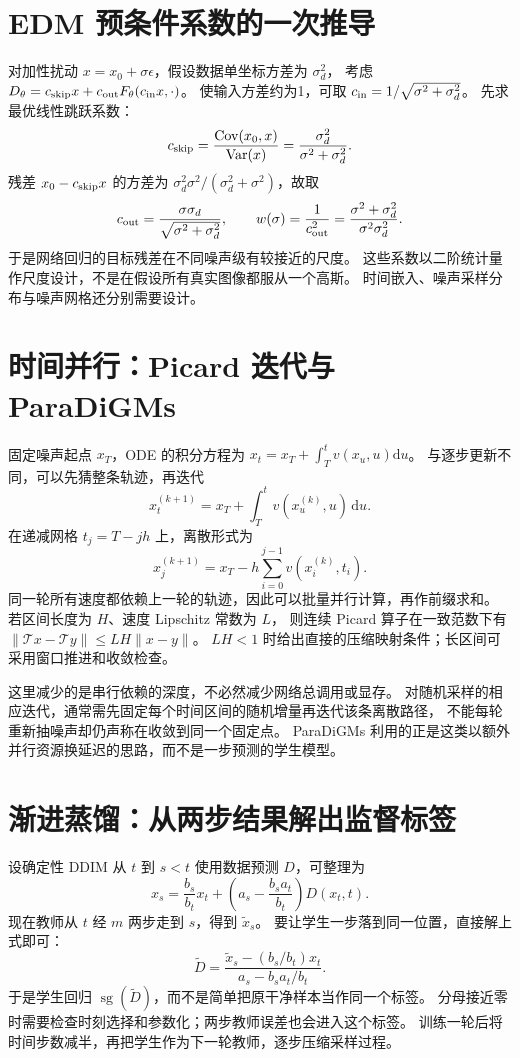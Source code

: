 \section{EDM 预条件系数的一次推导}
对加性扰动 $x=x_0+\sigma\epsilon$，假设数据单坐标方差为 $\sigma_d^2$，
考虑 $D_\theta=c_{\rm skip}x+c_{\rm out}F_\theta(c_{\rm in}x,\cdot)$。
使输入方差约为1，可取
$c_{\rm in}=1/\sqrt{\sigma^2+\sigma_d^2}$。
先求最优线性跳跃系数：
\[
c_{\rm skip}=\frac{\operatorname{Cov}(x_0,x)}{\operatorname{Var}(x)}
=\frac{\sigma_d^2}{\sigma^2+\sigma_d^2}.
\]
残差 $x_0-c_{\rm skip}x$ 的方差为
$\sigma_d^2\sigma^2/(\sigma_d^2+\sigma^2)$，故取
\[
c_{\rm out}=\frac{\sigma\sigma_d}{\sqrt{\sigma^2+\sigma_d^2}},
\qquad w(\sigma)=\frac1{c_{\rm out}^2}
=\frac{\sigma^2+\sigma_d^2}{\sigma^2\sigma_d^2}.
\]
于是网络回归的目标残差在不同噪声级有较接近的尺度。
这些系数以二阶统计量作尺度设计，不是在假设所有真实图像都服从一个高斯。
时间嵌入、噪声采样分布与噪声网格还分别需要设计。\cite{edm}

\section{时间并行：Picard 迭代与 ParaDiGMs}
固定噪声起点 $x_T$，ODE 的积分方程为
$x_t=x_T+\int_T^t v(x_u,u)\mathrm du$。
与逐步更新不同，可以先猜整条轨迹，再迭代
\[
x^{(k+1)}_t=x_T+\int_T^t v(x^{(k)}_u,u)\,\mathrm du.
\]
在递减网格 $t_j=T-jh$ 上，离散形式为
\[
x_j^{(k+1)}=x_T-h\sum_{i=0}^{j-1}v(x_i^{(k)},t_i).
\]
同一轮所有速度都依赖上一轮的轨迹，因此可以批量并行计算，再作前缀求和。
若区间长度为 $H$、速度 Lipschitz 常数为 $L$，
则连续 Picard 算子在一致范数下有 $\|\mathcal Tx-\mathcal Ty\|\leq LH\|x-y\|$。
$LH<1$ 时给出直接的压缩映射条件；长区间可采用窗口推进和收敛检查。

这里减少的是串行依赖的深度，不必然减少网络总调用或显存。
对随机采样的相应迭代，通常需先固定每个时间区间的随机增量再迭代该条离散路径，
不能每轮重新抽噪声却仍声称在收敛到同一个固定点。
ParaDiGMs 利用的正是这类以额外并行资源换延迟的思路，而不是一步预测的学生模型。

\section{渐进蒸馏：从两步结果解出监督标签}
设确定性 DDIM 从 $t$ 到 $s<t$ 使用数据预测 $D$，可整理为
\[
x_s=\frac{b_s}{b_t}x_t+
 \left(a_s-\frac{b_sa_t}{b_t}\right)D(x_t,t).
\]
现在教师从 $t$ 经 $m$ 两步走到 $s$，得到 $\tilde x_s$。
要让学生一步落到同一位置，直接解上式即可：
\[
\tilde D=\frac{\tilde x_s-(b_s/b_t)x_t}
 {a_s-b_sa_t/b_t}.
\label{supp:pd-target}
\]
于是学生回归 $\operatorname{sg}(\tilde D)$，而不是简单把原干净样本当作同一个标签。
分母接近零时需要检查时刻选择和参数化；两步教师误差也会进入这个标签。
训练一轮后将时间步数减半，再把学生作为下一轮教师，逐步压缩采样过程。

